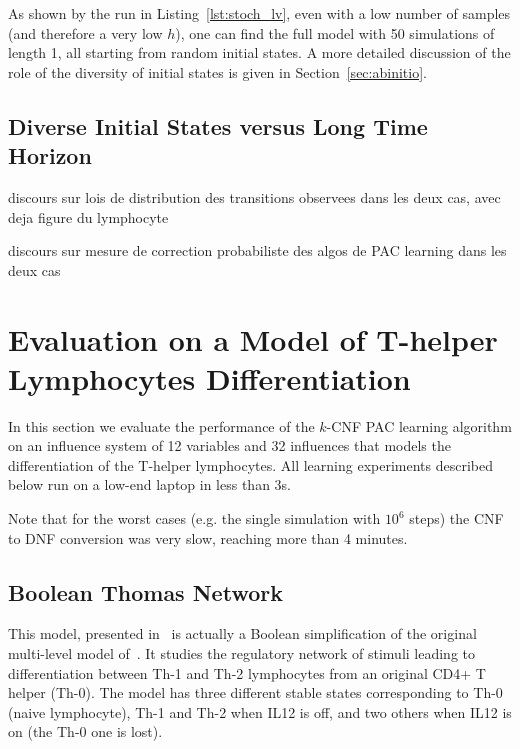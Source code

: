 \documentclass{llncs}
\newif\ifcomments%
\newcommand{\sylvain}[1]{\ifcomments\textcolor{green}{#1}\fi}
\begin{document}
As shown by the run in Listing~\ref{lst:stoch_lv}, even with a low number of
samples (and therefore a very low $h$), one can find the full model with 50
simulations of length 1, all starting from random initial states.
A more detailed discussion of the role of the diversity of initial states is
given in Section~\ref{sec:abinitio}.

\subsection{Diverse Initial States versus Long Time Horizon}

discours sur lois de distribution des transitions observees dans les deux cas, avec deja figure du lymphocyte

discours sur mesure de correction probabiliste des algos de PAC learning dans les deux cas

\sylvain{all the discourse before the examples, seems bad}







\section{Evaluation on a Model of T-helper Lymphocytes Differentiation}\label{ex:lympho}

In this section we evaluate the performance of the $k$-CNF PAC learning
algorithm on an influence system of 12 variables and 32 influences that models
the differentiation of the T-helper lymphocytes.
All learning experiments described below run on a
low-end laptop in less than 3s.
\sylvain{I need to update this}

Note that for the worst cases (e.g. the single simulation with $10^6$ steps)
the CNF to DNF conversion was very slow, reaching more than 4 minutes.

\subsection{Boolean Thomas Network}

This model, presented in~\cite{RRMTC06tcsb} is actually a Boolean
simplification of the original multi-level model
of~\cite{Mendoza06biosystems}. It studies the regulatory network of stimuli
leading to differentiation between Th-1 and Th-2 lymphocytes from an original
CD4+ T helper (Th-0).
The model has three different stable states corresponding to Th-0 (naive
lymphocyte), Th-1 and Th-2 when IL12 is off, and two others when IL12 is on
(the Th-0 one is lost).
\end{document}
